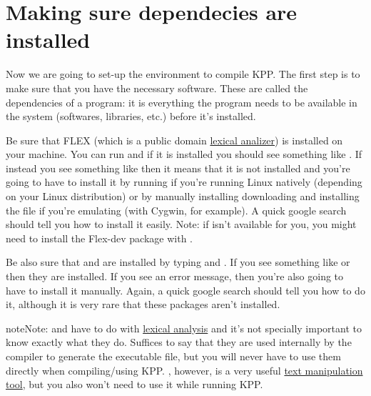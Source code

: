 \documentclass[letterpaper,10pt,openany,oneside]{sphinxmanual}
\begin{document}
\section{Making sure dependecies are installed}
\label{compiling:making-sure-dependecies-are-installed}
Now we are going to set-up the environment to compile KPP. The first step is to
make sure that you have the necessary software. These are called the
dependencies of a program: it is everything the program needs to be available
in the system (softwares, libraries, etc.) before it's installed.

Be sure that FLEX (which is a public domain \href{https://en.wikipedia.org/wiki/Lexical\_analysis}{lexical analizer}) is installed on your
machine. You can run  and if it is installed you should see
something like . If instead you see something like  then it means that it is not installed and you're going to
have to install it by running  if
you're running Linux natively (depending on your Linux distribution) or by
manually installing downloading and installing the file if you're emulating
(with Cygwin, for example). A quick google search should tell you how to
install it easily. Note: if  isn't available for you, you might need to
install the Flex-dev package with .

Be also sure that  and  are installed by typing 
and . If you see something like  or
 then they are installed. If you see an error message, then
you're also going to have to install it manually. Again, a quick google search
should tell you how to do it, although it is very rare that these packages
aren't installed.

\begin{notice}{note}{Note:}
 and  have to do with \href{https://en.wikipedia.org/wiki/Lexical\_analysis}{lexical analysis}
and it's not specially important to know exactly what they do. Suffices to
say that they are used internally by the compiler to generate the executable
file, but you will never have to use them directly when compiling/using KPP.
, however, is a very useful \href{https://en.wikipedia.org/wiki/Sed}{text manipulation tool},
but you also won't need to use it
while running KPP.
\end{notice}
\end{document}
